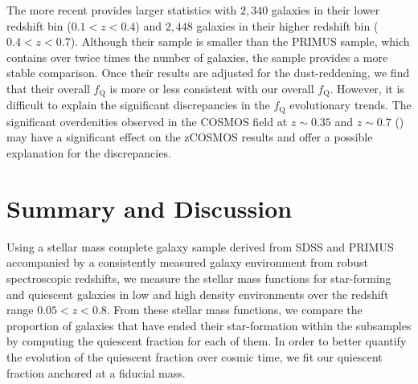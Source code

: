 \documentclass{emulateapj}
\begin{document}
The more recent \cite{Kovac:2014aa} provides larger statistics with
$2,340$ galaxies in their lower redshift bin ($0.1 < z < 0.4$) and
$2,448$ galaxies in their higher redshift bin ($0.4 < z <
0.7$). Although their sample is smaller than the PRIMUS sample, which
contains over twice times the number of galaxies, the
\cite{Kovac:2014aa} sample provides a more stable comparison.  Once
their results are adjusted for the dust-reddening, we
find that their overall $f_{\mathrm{Q}}$ is more or less consistent with
our overall $f_{\mathrm{Q}}$. However, it is difficult to explain the
significant discrepancies in the $f_{\mathrm{Q}}$ evolutionary trends.
The significant overdenities observed in the COSMOS field at $z \sim 0.35$ and $z \sim 0.7$ (\citealt{Lilly:2009aa, Kovac:2010ab}) may have a significant effect on the zCOSMOS results and offer a possible explanation for the discrepancies. 

\section{Summary and Discussion} \label{sec:summary}
Using a stellar mass complete galaxy sample derived from SDSS and
PRIMUS accompanied by a consistently measured galaxy environment from
robust spectroscopic redshifts, we measure the stellar mass functions
for star-forming and quiescent galaxies in low and high density
environments over the redshift range $0.05 < z < 0.8$. From these
stellar mass functions, we compare the proportion of galaxies that
have ended their star-formation within the subsamples by computing the
quiescent fraction for each of them. In order to better quantify the
evolution of the quiescent fraction over cosmic time, we fit our
quiescent fraction anchored at a fiducial mass. 
\end{document}
